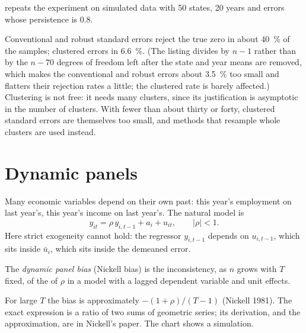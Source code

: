  repeats the experiment on simulated data with
50 states, 20 years and errors whose persistence is 0.8.

\label{lst:b3:panel-data:cluster}

\label{out:b3:panel-data:cluster}

Conventional and robust standard errors reject the true zero in about 40~\% of
the samples; clustered errors in 6.6~\%. %
(The listing divides by $n - 1$ rather than by the $n - 70$ degrees of freedom left
after the state and year means are removed, which makes the conventional and robust
errors about 3.5~\% too small and flatters their rejection rates a little; the
clustered rate is barely affected.)
Clustering is not free: it needs many clusters, since its justification is
asymptotic in the number of clusters. With fewer than about thirty or forty,
clustered standard errors are themselves too small, and methods that resample
whole clusters are used instead.

\section{Dynamic panels}\label{sec:b3:panel-data:dynamic}

Many economic variables depend on their own past: this year's employment on last
year's, this year's income on last year's. The natural model is
\[
  y_{it} = \rho\, y_{i,t-1} + a_i + u_{it}, \qquad |\rho| < 1.
\]
Here strict exogeneity cannot hold: the regressor $y_{i,t-1}$ depends on
$u_{i,t-1}$, which sits inside $\bar u_i$, which sits inside the demeaned
error.

\begin{definition}\label{def:b3:panel-data:nickell}
The \emph{dynamic panel bias} (Nickell bias) is the inconsistency, as $n$ grows
with $T$ fixed, of the  of $\rho$ in a model with a lagged
dependent variable and unit effects.
\end{definition}

For large $T$ the bias is approximately $-(1 + \rho)/(T - 1)$ (Nickell 1981).
\admitted
The exact expression is a ratio of two sums of geometric series; its
derivation, and the approximation, are in Nickell's paper. The chart shows a
simulation.


